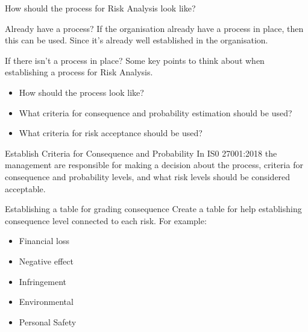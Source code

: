 \documentclass{beamer}
\begin{document}
\begin{frame}{How should the process for Risk Analysis look like?}{\insertsubsubsectionhead}
  \footnotesize
  \begin{block}{Already have a process?}
    If the organisation already have a process in place, then this can be used.
    Since it's already well established in the organisation.
  \end{block} 
  \begin{block}{If there isn't a process in place?}
    Some key points to think about when establishing a process for Risk
    Analysis.
    \begin{itemize}
      \item How should the process look like?
      \item What criteria for consequence and probability estimation should be
        used?
      \item What criteria for risk acceptance should be used?
      \end{itemize}
  \end{block}
  \begin{block}{Establish Criteria for Consequence and Probability}
    In IS0 27001:2018 the management are responsible for making a decision
    about the process, criteria for consequence and probability levels, and
    what risk levels should be considered acceptable. 
  \end{block}
\end{frame}
\begin{frame}{Establishing a table for grading consequence}{\insertsubsubsectionhead}
  Create a table for help establishing consequence level connected to each risk.
  For example:
  \begin{itemize}
    \item Financial loss
    \item Negative effect
    \item Infringement
    \item Environmental
    \item Personal Safety
  \end{itemize}
\end{frame}
\end{document}
